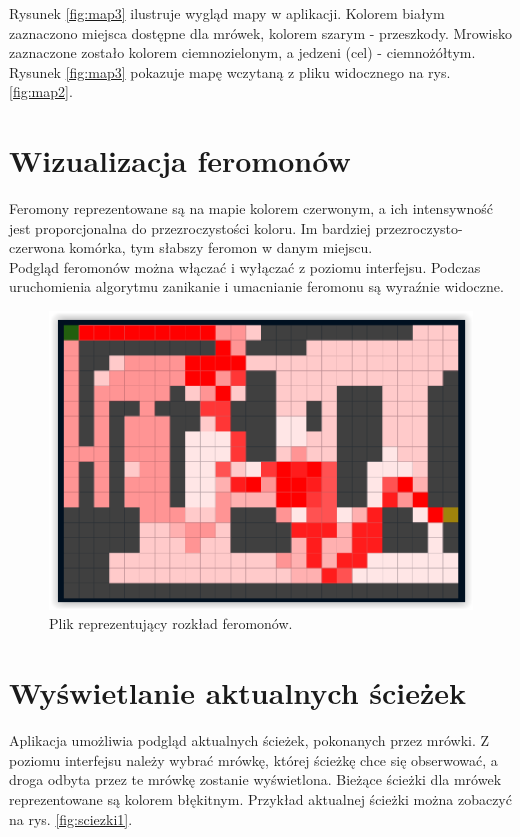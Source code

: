 \documentclass[printmode, openany, oneside, eng]{mgr}
\begin{document}
Rysunek \ref{fig:map3} ilustruje wygląd mapy w aplikacji. Kolorem białym zaznaczono miejsca dostępne dla mrówek, kolorem szarym - przeszkody. Mrowisko zaznaczone zostało kolorem ciemnozielonym, a jedzeni (cel) - ciemnożółtym. Rysunek \ref{fig:map3} pokazuje mapę wczytaną z pliku widocznego na rys. \ref{fig:map2}.

\section{Wizualizacja feromonów}\label{sec:mapaFeromony}
Feromony reprezentowane są na mapie kolorem czerwonym, a ich intensywność jest proporcjonalna do przezroczystości koloru. Im bardziej przezroczysto-czerwona komórka, tym słabszy feromon w danym miejscu.\\

Podgląd feromonów można włączać i wyłączać z poziomu interfejsu. Podczas uruchomienia algorytmu zanikanie i umacnianie feromonu są wyraźnie widoczne.

\begin{figure}[h]
\centering
\includegraphics[scale=1]{img/feromony1.png}
\caption{Plik reprezentujący rozkład feromonów.}
\label{fig:feromony1}
\end{figure}

\section{Wyświetlanie aktualnych ścieżek}\label{sec:mapaSciezki}

Aplikacja umożliwia podgląd aktualnych ścieżek, pokonanych przez mrówki. Z poziomu interfejsu należy wybrać mrówkę, której ścieżkę chce się obserwować, a droga odbyta przez te mrówkę zostanie wyświetlona. Bieżące ścieżki dla mrówek reprezentowane są kolorem błękitnym. Przykład aktualnej ścieżki można zobaczyć na rys. \ref{fig:sciezki1}.\newline
\end{document}
